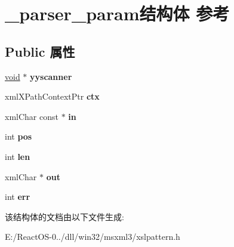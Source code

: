 \hypertarget{struct__parser__param}{}\section{\+\_\+parser\+\_\+param结构体 参考}
\label{struct__parser__param}
\subsection*{Public 属性}
\begin{DoxyCompactItemize}
\item 
\mbox{\label{struct__parser__param_a01fd77841acf030f13be7fe896a13a45}} 
\hyperlink{interfacevoid}{void} $\ast$ {\bfseries yyscanner}
\item 
\mbox{\label{struct__parser__param_abec5e50c015e49eb16937a40ae8a735f}} 
xml\+X\+Path\+Context\+Ptr {\bfseries ctx}
\item 
\mbox{\label{struct__parser__param_a61c91894f9336bf42e36ff72c58ed16c}} 
xml\+Char const  $\ast$ {\bfseries in}
\item 
\mbox{\label{struct__parser__param_abf6029d28e9acfe9f72c10e59a95f294}} 
int {\bfseries pos}
\item 
\mbox{\label{struct__parser__param_ae5ec830d0acb44f7f0e02a566fd046fb}} 
int {\bfseries len}
\item 
\mbox{\label{struct__parser__param_aced644a5d1ca35ff26c9bd006a8e3d72}} 
xml\+Char $\ast$ {\bfseries out}
\item 
\mbox{\label{struct__parser__param_a141e1671a2cec6ef9e1f7f07ab137dd1}} 
int {\bfseries err}
\end{DoxyCompactItemize}


该结构体的文档由以下文件生成\+:\begin{DoxyCompactItemize}
\item 
E\+:/\+React\+O\+S-\/0../dll/win32/msxml3/xslpattern.\+h\end{DoxyCompactItemize}
